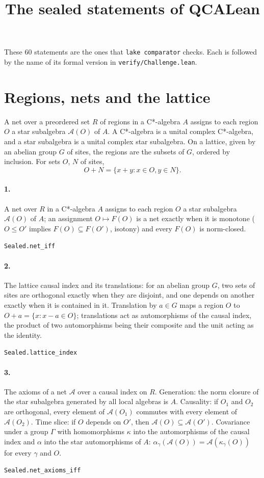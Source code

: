 \documentclass[11pt]{article}
\title{The sealed statements of QCALean}\date{}
\begin{document}
\maketitle
These 60 statements are the ones that \texttt{lake comparator} checks. Each is followed by the name of its formal version in \texttt{verify/Challenge.lean}.

\section*{Regions, nets and the lattice}
A net over a preordered set $R$ of regions in a C*-algebra $A$ assigns to each region $O$ a star subalgebra $\mathcal A(O)$ of $A$. A C*-algebra is a unital complex C*-algebra, and a star subalgebra is a unital complex star subalgebra. On a lattice, given by an abelian group $G$ of sites, the regions are the subsets of $G$, ordered by inclusion. For sets $O$, $N$ of sites, \[O + N = \{x + y : x \in O, y \in N\}.\]

\paragraph{1.} A net over $R$ in a C*-algebra $A$ assigns to each region $O$ a star subalgebra $\mathcal A(O)$ of $A$; an assignment $O \mapsto F(O)$ is a net exactly when it is monotone ($O \le O'$ implies $F(O) \subseteq F(O')$, isotony) and every $F(O)$ is norm-closed.\par{\footnotesize\texttt{Sealed.net\_iff}}

\paragraph{2.} The lattice causal index and its translations: for an abelian group $G$, two sets of sites are orthogonal exactly when they are disjoint, and one depends on another exactly when it is contained in it. Translation by $a \in G$ maps a region $O$ to $O + a = \{x : x - a \in O\}$; translations act as automorphisms of the causal index, the product of two automorphisms being their composite and the unit acting as the identity.\par{\footnotesize\texttt{Sealed.lattice\_index}}

\paragraph{3.} The axioms of a net $\mathcal A$ over a causal index on $R$. Generation: the norm closure of the star subalgebra generated by all local algebras is $A$. Causality: if $O_1$ and $O_2$ are orthogonal, every element of $\mathcal A(O_1)$ commutes with every element of $\mathcal A(O_2)$. Time slice: if $O$ depends on $O'$, then $\mathcal A(O) \subseteq \mathcal A(O')$. Covariance under a group $\Gamma$ with homomorphisms $\kappa$ into the automorphisms of the causal index and $\alpha$ into the star automorphisms of $A$: $\alpha_\gamma(\mathcal A(O)) = \mathcal A(\kappa_\gamma(O))$ for every $\gamma$ and $O$.\par{\footnotesize\texttt{Sealed.net\_axioms\_iff}}
\end{document}
